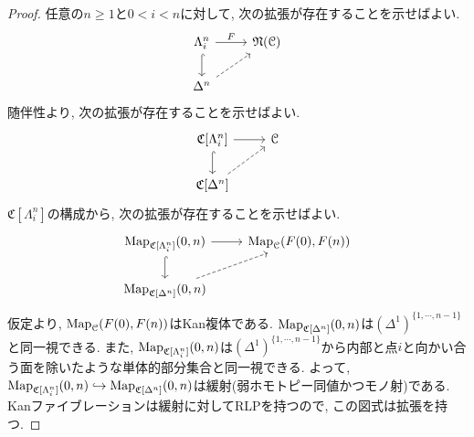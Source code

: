 \documentclass[uplatex, a4paper, 14Q, dvipdfmx]{jsreport}
\begin{document}
\begin{proof}
  任意の$n \geq 1$と$0 < i < n$に対して, 次の拡張が存在することを示せばよい. 
  \[\begin{tikzcd}
    {\Lambda^n_i} & {\mathfrak{N}(\C)} \\
    {\Delta^n}
    \arrow[hook, from=1-1, to=2-1]
    \arrow["F", from=1-1, to=1-2]
    \arrow[dashed, from=2-1, to=1-2]
  \end{tikzcd}\]
  随伴性より,  次の拡張が存在することを示せばよい.
  \[\begin{tikzcd}
    {\mathfrak{C}[\Lambda^n_i]} & \C \\
    {\mathfrak{C}[\Delta^n]}
    \arrow[hook, from=1-1, to=2-1]
    \arrow[from=1-1, to=1-2]
    \arrow[dashed, from=2-1, to=1-2]
  \end{tikzcd}\]
  $\mathfrak{C}[\Lambda^n_i]$の構成から, 次の拡張が存在することを示せばよい.
  \[\begin{tikzcd}
    {\Map_{\mathfrak{C}[\Lambda^n_i]}(0,n)} & {\Map_\C(F(0),F(n))} \\
    {\Map_{\mathfrak{C}[\Delta^n]}(0,n)}
    \arrow[hook, from=1-1, to=2-1]
    \arrow[from=1-1, to=1-2]
    \arrow[dashed, from=2-1, to=1-2]
  \end{tikzcd}\]
  仮定より, $\mathrm{Map}_{\mathcal{C}}(F(0),F(n))$はKan複体である. 
  $\mathrm{Map}_{\mathfrak{C}[\Delta^n]}(0,n)$は$(\Delta^1)^{\{1,\cdots,n-1\}}$と同一視できる. 
  また, $\mathrm{Map}_{\mathfrak{C}[\Lambda^n_i]}(0,n)$は$(\Delta^1)^{\{1,\cdots,n-1\}}$から内部と点$i$と向かい合う面を除いたような単体的部分集合と同一視できる. 
  よって, $\mathrm{Map}_{\mathfrak{C}[\Lambda^n_i]}(0,n) \hookrightarrow \mathrm{Map}_{\mathfrak{C}[\Delta^n]}(0,n)$は緩射(弱ホモトピー同値かつモノ射)である. 
  Kanファイブレーションは緩射に対してRLPを持つので, この図式は拡張を持つ. 
\end{proof}
\end{document}
